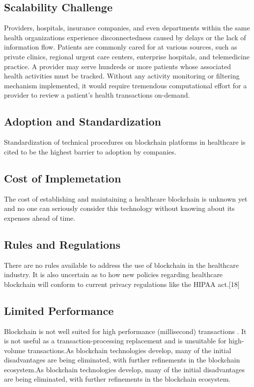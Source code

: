 \documentclass[12pt]{report}
\begin{document}
\subsection{Scalability Challenge}
Providers, hospitals, insurance companies, and even departments within the same health organizations experience disconnectedness
caused by delays or the lack of information flow. Patients are commonly cared for at various
sources, such as private clinics, regional urgent care centers, enterprise hospitals, and telemedicine practice. A provider may serve hundreds or more patients whose associated health
activities must be tracked. Without any activity monitoring or filtering mechanism implemented, it would require tremendous computational effort for a provider to review a patient’s
health transactions on-demand.
\subsection{Adoption and Standardization}
Standardization of technical procedures on blockchain platforms in healthcare is cited to be the highest barrier to adoption by companies.
\subsection{Cost of Implemetation}
The cost of establishing and maintaining a healthcare blockchain is unknown yet and no one can seriously consider this technology without knowing about its expenses ahead of time.
\subsection{Rules and Regulations}
There are no rules available to address the use of blockchain in the healthcare industry. It is also uncertain as to how new policies regarding healthcare blockchain will conform to current privacy regulations like the HIPAA act.[18]

\subsection{Limited Performance\cite{3}}
Blockchain is not well suited for high performance (millisecond) transactions . It is not useful as a transaction-processing
replacement and is unsuitable for  high-volume transactions.As blockchain technologies develop, many of the initial disadvantages are being eliminated, with further
refinements in the blockchain ecosystem.As blockchain technologies develop, many of the initial disadvantages are being eliminated, with further
refinements in the blockchain ecosystem.
\end{document}
